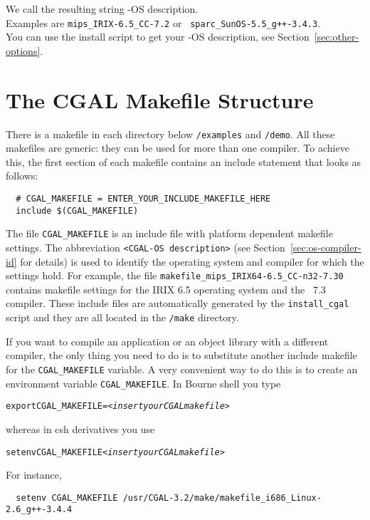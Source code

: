 We call the resulting string \cgal-OS description.\\ Examples are
\texttt{mips\_IRIX-6.5\_CC-7.2} or {\tt
  sparc\_SunOS-5.5\_g++-3.4.3}.\\ You can use the install script to
get your \cgal-OS description, see Section~\ref{sec:other-options}.

\section{The CGAL Makefile Structure\label{sec:makefiles}}

There is a makefile in each directory below \texttt{\cgaldir/examples}
and \texttt{\cgaldir/demo}. All these makefiles are generic: they can
be used for more than one compiler. To achieve this, the first section
of each makefile contains an include statement that looks as follows:
\begin{verbatim}
  # CGAL_MAKEFILE = ENTER_YOUR_INCLUDE_MAKEFILE_HERE
  include $(CGAL_MAKEFILE)
\end{verbatim}

The file \texttt{CGAL\_MAKEFILE} is an include
file with platform dependent makefile
settings. The abbreviation \texttt{<CGAL-OS description>} (see
Section~\ref{sec:os-compiler-id} for details) is used to identify the
operating system and compiler for which the settings hold. For
example, the file \texttt{makefile\_mips\_IRIX64-6.5\_CC-n32-7.30}
contains makefile settings for the IRIX 6.5 operating system and the
\mipsprocc\ 7.3 compiler.  These include files are automatically
generated by the \texttt{install\_cgal} script and they are all
located in the \texttt{\cgaldir/make} directory.

If you want to compile an application or an object library with a
different compiler, the only thing you need to do is to substitute
another include makefile for the \texttt{CGAL\_MAKEFILE} variable. A
very convenient way to do this is to create an environment variable
\texttt{CGAL\_MAKEFILE}. In Bourne shell you type
\begin{alltt}
  export CGAL_MAKEFILE=<\textit{insert your CGAL makefile}>
\end{alltt}
whereas in csh derivatives you use
\begin{alltt}
  setenv CGAL_MAKEFILE <\textit{insert your CGAL makefile}>
\end{alltt}
For instance,
\begin{verbatim}
  setenv CGAL_MAKEFILE /usr/CGAL-3.2/make/makefile_i686_Linux-2.6_g++-3.4.4
\end{verbatim}

